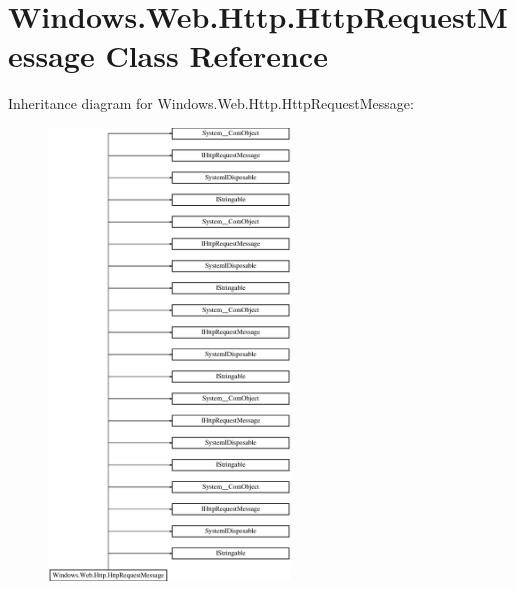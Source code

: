 \hypertarget{class_windows_1_1_web_1_1_http_1_1_http_request_message}{}\section{Windows.\+Web.\+Http.\+Http\+Request\+Message Class Reference}
\label{class_windows_1_1_web_1_1_http_1_1_http_request_message}
Inheritance diagram for Windows.\+Web.\+Http.\+Http\+Request\+Message\+:\begin{figure}[H]
\begin{center}
\leavevmode
\includegraphics[height=12.000000cm]{class_windows_1_1_web_1_1_http_1_1_http_request_message}
\end{center}
\end{figure}
